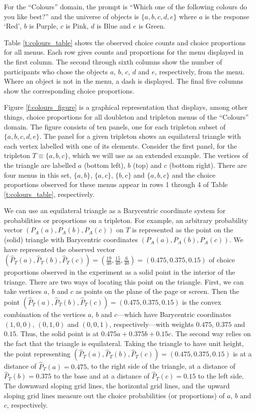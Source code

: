\documentclass[11pt,letter]{article}
\begin{document}
For the ``Colours'' domain, the prompt is ``Which one of the following colours do you like best?'' and the universe of objects is $\{a,b,c,d,e\}$ where $a$ is the response `Red', $b$ is Purple, $c$ is Pink, $d$ is Blue and $e$ is Green.

Table \ref{t:colours_table} shows the observed choice counts and choice proportions for all menus.
Each row gives counts and proportions for the menu displayed in the first column.
The second through sixth columns show the number of participants who chose the objects $a$, $b$, $c$, $d$ and $e$, respectively, from the menu.
Where an object is not in the menu, a dash is displayed.
The final five columns show the corresponding choice proportions.

Figure \ref{f:colours_figure} is a graphical representation that displays, among other things, choice proportions for all doubleton and tripleton menus of the ``Colours'' domain.
The figure consists of ten panels, one for each tripleton subset of $\{a,b,c,d,e\}$.
The panel for a given tripleton shows an equilateral triangle with each vertex labelled with one of its elements.
Consider the first panel, for the tripleton $T \equiv \{a,b,c\}$, which we will use as an extended example.
The vertices of the triangle are labelled $a$ (bottom left), $b$ (top) and $c$ (bottom right).
There are four menus in this set, $\{a,b\}$, $\{a,c\}$, $\{b,c\}$ and $\{a,b,c\}$ and the choice proportions observed for these menus appear in rows 1 through 4 of Table \ref{t:colours_table}, respectively.

We can use an equilateral triangle as a Barycentric coordinate system for probabilities or proportions on a tripleton.
For example, an arbitrary probability vector $(P_A(a),P_A(b),P_A(c))$ on $T$ is represented as the point on the (solid) triangle with Barycentric coordinates $(P_A(a),P_A(b),P_A(c))$.
We have represented the observed vector $(\hat P_T(a), \hat P_T(b), \hat P_T(c)) = (\tfrac{19}{40}, \tfrac{15}{40}, \tfrac{6}{40}) = (0.475, 0.375, 0.15)$ of choice proportions observed in the experiment as a solid point in the interior of the triange.
There are two ways of locating this point on the triangle.
First, we can take vertices $a$, $b$ and $c$ as points on the plane of the page or screen.
Then the point $(\hat P_T(a),\hat P_T(b),\hat P_T(c)) = (0.475, 0.375, 0.15)$ is the convex combination of the vertices $a$, $b$ and $c$---which have Barycentric coordinates $(1,0,0)$, $(0,1,0)$ and $(0,0,1)$, respectively---with weights $0.475$, $0.375$ and $0.15$.
Thus, the solid point is at $0.475 a + 0.375 b + 0.15 c$.
The second way relies on the fact that the triangle is equilateral.
Taking the triangle to have unit height, the point representing $(\hat P_T(a),\hat P_T(b),\hat P_T(c)) = (0.475, 0.375, 0.15)$ is at a distance of $\hat P_T(a) = 0.475$, to the right side of the triangle, at a distance of $\hat P_T(b) = 0.375$ to the base and at a distance of $\hat P_T(c) = 0.15$ to the left side.
The downward sloping grid lines, the horizontal grid lines, and the upward sloping grid lines measure out the choice probabilities (or proportions) of $a$, $b$ and $c$, respectively.
\end{document}
